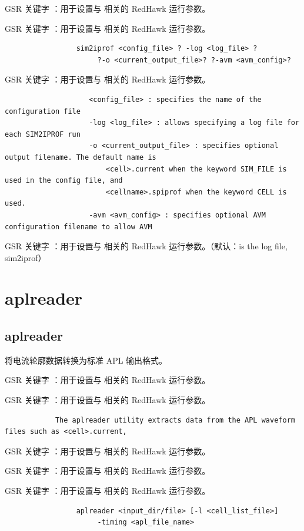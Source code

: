 GSR 关键字 ：用于设置与  相关的 RedHawk 运行参数。

GSR 关键字 ：用于设置与  相关的 RedHawk 运行参数。

\begin{lstlisting}
                 sim2iprof <config_file> ? -log <log_file> ?
                      ?-o <current_output_file>? ?-avm <avm_config>?
\end{lstlisting}

GSR 关键字 ：用于设置与  相关的 RedHawk 运行参数。

\begin{lstlisting}
                    <config_file> : specifies the name of the configuration file
                    -log <log_file> : allows specifying a log file for each SIM2IPROF run
                    -o <current_output_file> : specifies optional output filename. The default name is
                        <cell>.current when the keyword SIM_FILE is used in the config file, and
                        <cellname>.spiprof when the keyword CELL is used.
                    -avm <avm_config> : specifies optional AVM configuration filename to allow AVM
\end{lstlisting}

GSR 关键字 ：用于设置与  相关的 RedHawk 运行参数。（默认：is the log file, sim2iprof）

\section{aplreader}
\subsection*{aplreader}

将电流轮廓数据转换为标准 APL 输出格式。

GSR 关键字 ：用于设置与  相关的 RedHawk 运行参数。

GSR 关键字 ：用于设置与  相关的 RedHawk 运行参数。

\begin{lstlisting}
            The aplreader utility extracts data from the APL waveform files such as <cell>.current,
\end{lstlisting}

GSR 关键字 ：用于设置与  相关的 RedHawk 运行参数。

GSR 关键字 ：用于设置与  相关的 RedHawk 运行参数。

GSR 关键字 ：用于设置与  相关的 RedHawk 运行参数。

\begin{lstlisting}
                 aplreader <input_dir/file> [-l <cell_list_file>]
                      -timing <apl_file_name>
\end{lstlisting}


